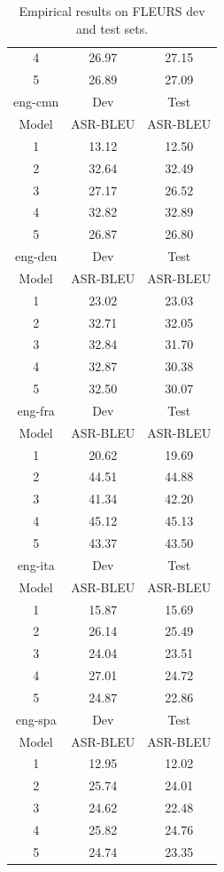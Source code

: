 \begin{table}[htbp!]
\begin{tabular}{c|c|c}
4 & 26.97 & 27.15 \\
5 & 26.89 & 27.09 \\
\hline
      {eng-cmn} & \multicolumn{1}{c|}{Dev} & \multicolumn{1}{c}{Test} \\ \hline
      Model & ASR-BLEU &  ASR-BLEU \\ \hline
1 & 13.12 & 12.50 \\
2 & 32.64 & 32.49 \\
3 & 27.17 & 26.52 \\
4 & 32.82 & 32.89 \\
5 & 26.87 & 26.80 \\
\hline
      {eng-deu} & \multicolumn{1}{c|}{Dev} & \multicolumn{1}{c}{Test} \\ \hline
      Model & ASR-BLEU &  ASR-BLEU \\ \hline
1 & 23.02 & 23.03 \\
2 & 32.71 & 32.05 \\
3 & 32.84 & 31.70 \\
4 & 32.87 & 30.38 \\
5 & 32.50 & 30.07 \\
\hline
      {eng-fra} & \multicolumn{1}{c|}{Dev} & \multicolumn{1}{c}{Test} \\ \hline
      Model & ASR-BLEU & ASR-BLEU \\ \hline
1 & 20.62 & 19.69 \\
2 & 44.51 & 44.88 \\
3 & 41.34 & 42.20 \\
4 & 45.12 & 45.13 \\
5 & 43.37 & 43.50 \\
\hline
      {eng-ita} & \multicolumn{1}{c|}{Dev} & \multicolumn{1}{c}{Test} \\ \hline
      Model & ASR-BLEU &  ASR-BLEU \\ \hline
1 & 15.87 & 15.69 \\
2 & 26.14 & 25.49 \\
3 & 24.04 & 23.51 \\
4 & 27.01 & 24.72 \\
5 & 24.87 & 22.86 \\
\hline
      {eng-spa} & \multicolumn{1}{c|}{Dev} & \multicolumn{1}{c}{Test} \\ \hline
      Model & ASR-BLEU &  ASR-BLEU \\ \hline
1 & 12.95 & 12.02 \\
2 & 25.74 & 24.01 \\
3 & 24.62 & 22.48 \\
4 & 25.82 & 24.76 \\
5 & 24.74 & 23.35 \\ 
\hline
    \end{tabular}
    \caption{Empirical results on FLEURS dev and test sets.}
    \label{tab:express_fleurs}
\end{table}

